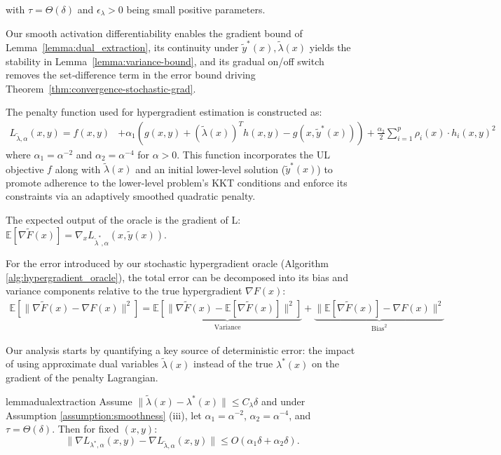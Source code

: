 \documentclass[letterpaper]{article} %
\newcommand{\1}{\mathbf{1}}
\begin{document}
with $\tau = \Theta(\delta)$ and $\epsilon_\lambda > 0$ being small positive parameters.

Our smooth activation differentiability enables the gradient bound of Lemma~\ref{lemma:dual_extraction}, its continuity under $\tilde{y}^*(x),\tilde{\lambda}(x)$ yields the stability in Lemma~\ref{lemma:variance-bound}, and its gradual on/off switch removes the set‑difference term in the error bound driving Theorem~\ref{thm:convergence-stochastic-grad}.

The penalty function used for hypergradient estimation is constructed as:
\begin{align}
L_{\tilde{\lambda},\alpha}(x,y) = f(x, y) &+ \alpha_1 \left( g(x, y) + (\tilde{\lambda}(x))^T h(x, y) - g(x, \tilde{y}^*(x)) \right) \nonumber + \frac{\alpha_2}{2} \sum_{i=1}^{p} \rho_i(x) \cdot h_i(x, y)^2 \label{eq:penalty_hg}
\end{align}
where $\alpha_1 = \alpha^{-2}$ and $\alpha_2 = \alpha^{-4}$ for $\alpha > 0$. This function incorporates the UL objective $f$ along with $\tilde{\lambda}(x)$ and an initial lower-level solution ($\tilde{y}^*(x)$) to promote adherence to the lower-level problem's KKT conditions and enforce its constraints via an adaptively smoothed quadratic penalty.

The expected output of the oracle is the gradient of L: $\mathbb{E}[\nabla\tilde{F}(x)] = \nabla_x L_{\tilde{\lambda}^*,\alpha}(x, \tilde{y}(x))$.


For the error introduced by our stochastic hypergradient oracle (Algorithm \ref{alg:hypergradient_oracle}), the total error can be decomposed into its bias and variance components relative to the true hypergradient $\nabla F(x)$:
\begin{align}
\mathbb{E}[\|\nabla\tilde{F}(x) - \nabla F(x)\|^2] = \underbrace{\mathbb{E}[\|\nabla\tilde{F}(x) - \mathbb{E}[\nabla\tilde{F}(x)]\|^2]}_{\text{Variance}} + \underbrace{\|\mathbb{E}[\nabla\tilde{F}(x)] - \nabla F(x)\|^2}_{\text{Bias}^2}
\end{align}

Our analysis starts by quantifying a key source of deterministic error: the impact of using approximate dual variables $\tilde{\lambda}(x)$ instead of the true $\lambda^*(x)$ on the gradient of the penalty Lagrangian.
\begin{restatable}{lemma}{dualextraction}
\label{lemma:dual_extraction}
Assume $\|\tilde{\lambda}(x) - \lambda^*(x)\| \leq C_{\lambda}\delta$ and under Assumption \ref{assumption:smoothness} (iii), let $\alpha_1 = \alpha^{-2}$, $\alpha_2 = \alpha^{-4}$, and $\tau = \Theta(\delta)$. Then for fixed $(x,y)$:
$$ \|\nabla L_{\lambda^*, \alpha}(x, y) - \nabla L_{\tilde{\lambda},\alpha}(x,y)\| \leq O(\alpha_1 \delta + \alpha_2 \delta). $$
\end{restatable}
\end{document}
